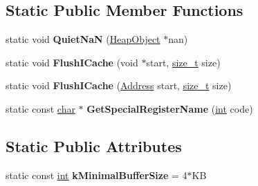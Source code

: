 \subsection*{Static Public Member Functions}
\begin{DoxyCompactItemize}
\item 
\mbox{\label{classv8_1_1internal_1_1AssemblerBase_a11f5cc896549fe763ac528492f16111e}} 
static void {\bfseries Quiet\+NaN} (\mbox{\hyperlink{classv8_1_1internal_1_1HeapObject}{Heap\+Object}} $\ast$nan)
\item 
\mbox{\label{classv8_1_1internal_1_1AssemblerBase_af459f320c3fa943197c11c096572e676}} 
static void {\bfseries Flush\+I\+Cache} (void $\ast$start, \mbox{\hyperlink{classsize__t}{size\+\_\+t}} size)
\item 
\mbox{\label{classv8_1_1internal_1_1AssemblerBase_aa28ff6af7ee720d2d303b94f3a658a74}} 
static void {\bfseries Flush\+I\+Cache} (\mbox{\hyperlink{classuintptr__t}{Address}} start, \mbox{\hyperlink{classsize__t}{size\+\_\+t}} size)
\item 
\mbox{\label{classv8_1_1internal_1_1AssemblerBase_ac1e8f46945c3cc0e29ae7710bc02751e}} 
static const \mbox{\hyperlink{classchar}{char}} $\ast$ {\bfseries Get\+Special\+Register\+Name} (\mbox{\hyperlink{classint}{int}} code)
\end{DoxyCompactItemize}
\subsection*{Static Public Attributes}
\begin{DoxyCompactItemize}
\item 
\mbox{\label{classv8_1_1internal_1_1AssemblerBase_a58ac353bfad9e4a1206864e76baec7f8}} 
static const \mbox{\hyperlink{classint}{int}} {\bfseries k\+Minimal\+Buffer\+Size} = 4$\ast$KB
\end{DoxyCompactItemize}
